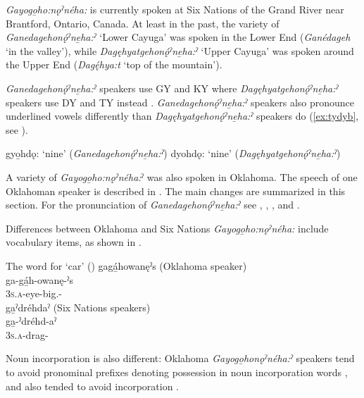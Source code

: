 \textit{Gayogo̱ho:nǫˀnéha:} is currently spoken at Six Nations of the Grand River near Brantford, Ontario, Canada. At least in the past, the variety of \textit{Ganedagehonǫ́ˀ\-ne̱ha:ˀ} ‘Lower Cayuga’ was spoken in the Lower End (\textit{Ganédageh} ‘in the valley’), while \textit{Dagęhyatgehonǫ́ˀne̱ha:ˀ} ‘Upper Cayuga’ was spoken around the Upper End (\textit{Dagę́hya:t} ‘top of the mountain’).

\textit{Ganedagehonǫ́ˀne̱ha:ˀ} speakers use GY and KY where \textit{Dagęhyatgehonǫ́ˀne̱ha:ˀ} speakers use DY and TY instead . \textit{Ganedagehonǫ́ˀne̱ha:ˀ} speakers also pronounce underlined vowels  differently than \textit{Dagęhyatgehonǫ́ˀne̱ha:ˀ} speakers do (\ref{ex:tydyb}, see ). 

\ea\label{ex:tydy}
\ea gyo̱hdǫ: ‘nine’ (\textit{Ganedagehonǫ́ˀne̱ha:ˀ})\label{ex:tydya}
\ex dyohdǫ: ‘nine’ (\textit{Dagęhyatgehonǫ́ˀne̱ha:ˀ})\label{ex:tydyb}
\z
\z

A variety of \textit{Gayogo̱ho:nǫˀnéha:}ˀ was also spoken in Oklahoma. The speech of one Oklahoman speaker is described in \citet{mithun_incipient_1989}. The main changes are summarized in this section. For the pronunciation of \textit{Ganedage\-honǫ́ˀ\-ne̱ha:ˀ} see , , , and .

Differences between Oklahoma and Six Nations \textit{Gayogo̱ho:nǫˀnéha:} include vocabulary items, as shown in . 

\FloatBarrier
\ea \label{ex:word.for.car} The word for ‘car’ (\cite[247]{mithun_incipient_1989})
\ea gagá̱howanęˀs  (Oklahoma speaker)\\
\gll ga-gá̱h-owanę-ˀs\\
\textsc{3s.a}-eye-big.{\stat}-\plural\\
\ex ga̱ˀdréhdaˀ (Six Nations speakers)\\
\gll ga̱-ˀdréhd-aˀ\\
\textsc{3s.a}-drag-{\nounstemformer}\\
\z
\z

Noun incorporation is also different: Oklahoma \textit{Gayogo̱honǫˀnéha:ˀ} speakers tend to avoid pronominal prefixes denoting possession in noun incorporation words , and also tended to avoid incorporation  .

